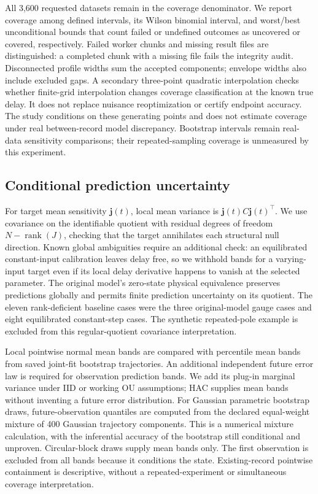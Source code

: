 All 3,600 requested datasets remain in the coverage denominator. We report
coverage among defined intervals, its Wilson binomial interval, and worst/best
unconditional bounds that count failed or undefined outcomes as uncovered or
covered, respectively. Failed worker chunks and missing result files are
distinguished: a completed chunk with a missing file fails the integrity audit.
Disconnected profile widths sum the accepted components; envelope widths also
include excluded gaps. A secondary three-point quadratic interpolation checks
whether finite-grid interpolation changes coverage classification at the known
true delay. It does not replace nuisance reoptimization or certify endpoint
accuracy. The study conditions on these generating points and does not estimate
coverage under real between-record model discrepancy.
Bootstrap intervals remain real-data sensitivity comparisons; their
repeated-sampling coverage is unmeasured by this experiment.

\subsection{Conditional prediction uncertainty}
For target mean sensitivity $\bm j(t)$, local mean variance is
$\bm j(t)C\bm j(t)^\top$. We use covariance on the identifiable quotient with
residual degrees of freedom $N-\operatorname{rank}(J)$, checking that the target
annihilates each structural null direction. Known global ambiguities require
an additional check: an equilibrated constant-input calibration leaves delay
free, so we withhold bands for a varying-input target even if its local delay
derivative happens to vanish at the selected parameter. The original model's
zero-state physical equivalence preserves predictions globally and permits
finite prediction uncertainty on its quotient.
The eleven rank-deficient baseline cases were the three original-model gauge
cases and eight equilibrated constant-step cases. The synthetic repeated-pole
example is excluded from this regular-quotient covariance interpretation.

Local pointwise normal mean bands are compared with percentile mean bands from
saved joint-fit bootstrap trajectories. An additional independent future error
law is required for observation prediction bands. We add its plug-in marginal
variance under IID or working OU assumptions; HAC supplies mean bands without
inventing a future error distribution. For Gaussian parametric bootstrap draws,
future-observation quantiles are computed from the declared equal-weight mixture
of 400 Gaussian trajectory components. This is a numerical mixture calculation,
with the inferential accuracy of the bootstrap still conditional and unproven.
Circular-block draws supply mean bands only. The first observation is excluded
from all bands because it conditions the state. Existing-record pointwise
containment is descriptive, without a repeated-experiment or simultaneous
coverage interpretation.

